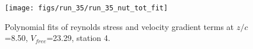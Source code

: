 \begin{figure}[H]
\centering
\texttt{[image: figs/run\_35/run\_35\_nut\_tot\_fit]}
\caption{Polynomial fits of reynolds stress and velocity gradient terms at $z/c$=8.50, $V_{free}$=23.29, station 4.}
\label{fig:run_35_nut_tot_fit}
\end{figure}


